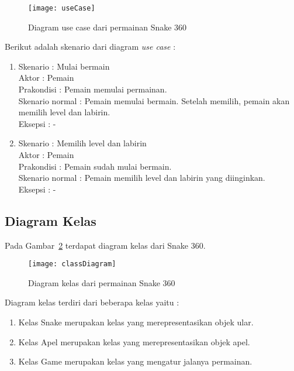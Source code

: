 \begin{figure}[H]
	\centering  
	\texttt{[image: useCase]}  
	\caption[Diagram use case dari permainan Snake 360]{Diagram use case dari permainan Snake 360}
	\label{fig:useCase} 
\end{figure}

Berikut adalah skenario dari diagram \textit{use case} :

\begin{enumerate}
	\item Skenario : Mulai bermain \\
Aktor : Pemain \\
Prakondisi : Pemain memulai permainan.\\
Skenario normal : Pemain memulai bermain. Setelah memilih, pemain akan memilih level dan labirin. \\
Eksepsi : - \\

	\item Skenario : Memilih level dan labirin \\
Aktor : Pemain \\
Prakondisi : Pemain sudah mulai bermain. \\
Skenario normal : Pemain memilih level dan labirin yang diinginkan. \\ 
Eksepsi : - \\
\end{enumerate}

\subsection{Diagram Kelas}
Pada Gambar~\ref{fig:classDiagram} terdapat diagram kelas dari Snake 360.

\begin{figure}[H]
	\centering  
	\texttt{[image: classDiagram]}  
	\caption[Diagram class dari permainan Snake 360]{Diagram kelas dari permainan Snake 360}
	\label{fig:classDiagram} 
\end{figure}

Diagram kelas terdiri dari beberapa kelas yaitu :

\begin{enumerate}
	\item Kelas Snake merupakan  kelas yang merepresentasikan objek ular.
	\item Kelas Apel merupakan kelas yang merepresentasikan objek apel.
	\item Kelas Game merupakan kelas yang mengatur jalanya permainan.
\end{enumerate}

